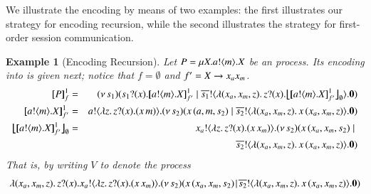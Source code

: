 \documentclass[preprint,11pt]{elsarticle}
\newtheorem{example}{Example}[section]
\begin{document}
{{We illustrate the encoding by means of two examples: the first illustrates our strategy for encoding recursion, while the second illustrates the strategy for first-order session communication.}


 


%
\begin{example}[Encoding Recursion]
Let $P = \mu X. a ! \langle m \rangle . X$ be an \HOp process.
Its encoding into \HO is given next; notice that $f = \emptyset$ and $f' = X \rightarrow x_ax_m$.
\begin{eqnarray*}
	\pmapp{P}{1}{f} &=&
	\newsp{s_1}{ \binp{s_1}{x} \pmapp{\bout{a}{m} \varp{X}}{1}{{f'}} \Par \bout{\dual{s_1}}{ \abs{(x_a, x_m, z)} \binp{z}{x} \auxmapp{\pmapp{\bout{a}{m} \varp{X}}{1}{{f'}}}{{}}{\es} } \inact} \\
\pmapp{\bout{a}{m} \varp{X}}{1}{{ f'}} &=&
	\bout{a}{\abs{z}{\binp{z}{x} (\appl{x}{m})}} \newsp{s_2}{\appl{x}{(a,m, s_2)}  \Par \bout{\dual{s_2}}{\abs{(x_a, x_m, z)}{\appl{x}{(x_a, x_m, z)}}} \inact} \\
	\auxmapp{\pmapp{\bout{a}{m} \varp{X}}{1}{{f'}}}{{}}{\es}
	  & = & 
	\bout{x_a}{\abs{z}{\binp{z}{x} (\appl{x}{x_m})}} \newsp{s_2}{\appl{x}{(x_a,x_m, s_2)}  \Par \\
	& & \qquad \qquad \qquad \qquad \qquad \qquad \qquad \bout{\dual{s_2}}{\abs{(x_a, x_m, z)}{\appl{x}{(x_a, x_m, z)}}} \inact}
\end{eqnarray*}
That is, by writing $V$ to denote the process
$$
\lambda (x_a, x_m, z).\,z ? (x) . x_a ! \langle \lambda z.\,z ? (x) . (x\, {x_m}) \rangle . (\nu\, s_2)(x\, {(x_a,x_m, s_2)}  \!\;|\;\! \overline{s_2} ! \langle \lambda (x_a, x_m, z).\,x\, {(x_a, x_m, z)} \rangle . \mathbf{0})
$$
\end{example}}
\end{document}
